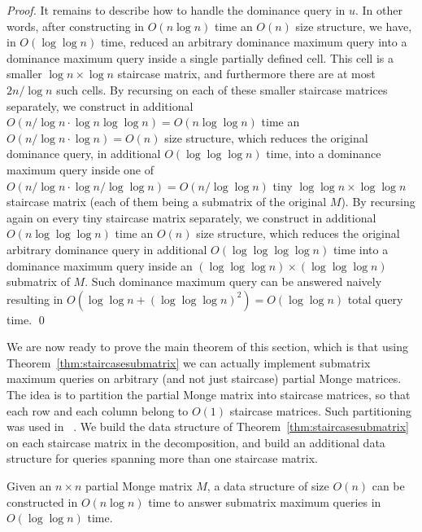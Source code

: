 \documentclass{llncs}
\begin{document}
\begin{proof}
It remains to describe how to handle the dominance query in $u$. In
other words, after constructing in $O(n\log n)$ time an $O(n)$ size
structure, we have,  in $O(\log\log n)$ time, 
reduced an arbitrary dominance maximum query into a dominance maximum query inside
a single partially defined cell. This cell is a smaller $\log n \times \log n$ staircase
 matrix, and furthermore there are at most $2 n/\log n$ such cells. By recursing on each of
 these smaller staircase matrices separately, we construct in
 additional $O(n/\log n \cdot \log n \log\log n) = O(n \log\log n)$ time an
 $O(n/\log n \cdot \log n) = O(n)$ size structure, which reduces the
 original dominance query, in
 additional $O(\log\log\log n)$ time, into 
 a dominance maximum query inside one of $O(n/\log n \cdot \log n/\log\log n)=O(n/\log\log n)$ tiny $\log\log n \times \log\log n$
 staircase matrix (each of them being a submatrix of the original $M$). By recursing again
 on every tiny staircase matrix separately,
 we construct in additional $O(n\log \log \log n)$ time an $O(n)$ size
 structure, which reduces the original arbitrary dominance query in
 additional $O(\log\log\log\log n)$  time  into a dominance maximum query inside 
 an $(\log\log\log n)\times (\log\log\log n)$ submatrix of $M$. Such dominance maximum
 query can be answered naively resulting in $O(\log\log n+(\log\log\log n)^{2})=O(\log\log n)$ total query time.
 \qed \end{proof}

We are now ready to prove the main theorem of this section, which is that using Theorem~\ref{thm:staircasesubmatrix} we can actually implement submatrix maximum queries on arbitrary (and not just staircase) partial Monge
matrices. The idea is to partition the partial Monge matrix into
staircase matrices, so that each row and each column belong to $O(1)$
staircase matrices.  Such partitioning was used in~\cite{AggarwalK90,ourICALP} . We build the data structure of
Theorem~\ref{thm:staircasesubmatrix} on each staircase matrix in the
decomposition, and build an additional data structure for queries
spanning more than one staircase matrix. 



\begin{theorem}
\label{thm:partialsubmatrix}
Given an $n\times n$ partial Monge matrix $M$, a data structure of size $O(n)$ can be constructed
in $O(n\log n)$ time to answer submatrix maximum queries in $O(\log\log n)$ time.
\end{theorem}
\end{document}

